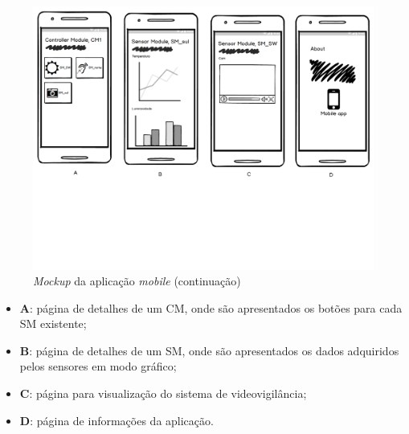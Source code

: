 \begin{figure}[h]
	\centering
	\includegraphics[width=\linewidth]{esquemas/mockup/2.pdf}
	\caption{\textit{Mockup} da aplicação \textit{mobile} (continuação)}
	\label{mock2}
\end{figure}

\begin{itemize}
	\item \textbf{A}: página de detalhes de um \acl{CM}, onde são apresentados os botões para cada \acl{SM} existente; 
	\item \textbf{B}: página de detalhes de um \acl{SM}, onde são apresentados os dados adquiridos pelos sensores em modo gráfico; 
	\item \textbf{C}: página para visualização do sistema de videovigilância; 
	\item \textbf{D}: página de informações da aplicação.
\end{itemize}